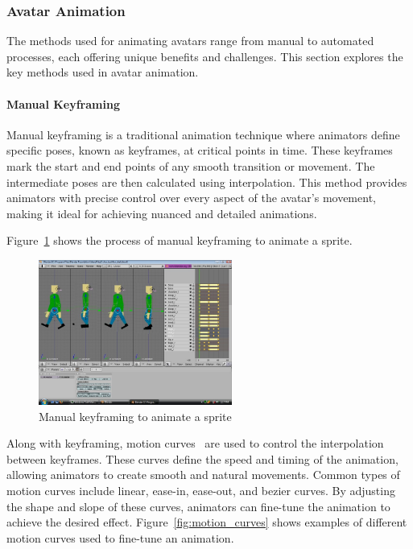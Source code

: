 \documentclass[../../main.tex]{subfiles}
\begin{document}
\subsubsection{Avatar Animation}
\label{ch:background_work:sign_language_synthesis:3d_techniques:avatar_animation}

The methods used for animating avatars range from manual to automated processes, each offering unique benefits and challenges. This section explores the key methods used in avatar animation.

\paragraph{Manual Keyframing}
\label{ch:background_work:sign_language_synthesis:3d_techniques:avatar_animation:manual_keyframing}

Manual keyframing is a traditional animation technique where animators define specific poses, known as keyframes, at critical points in time. These keyframes mark the start and end points of any smooth transition or movement. The intermediate poses are then calculated using interpolation. This method provides animators with precise control over every aspect of the avatar’s movement, making it ideal for achieving nuanced and detailed animations.

Figure~\ref{fig:keyframing} shows the process of manual keyframing to animate a sprite.

\begin{figure} 
  \centering \includegraphics[width = 2.5in]{chapters/background_work/images/keyframing.png} 
  \caption{Manual keyframing to animate a sprite} 
  \label{fig:keyframing} 
\end{figure}

Along with keyframing, motion curves~\cite{10.1145/218380.218422} are used to control the interpolation between keyframes. These curves define the speed and timing of the animation, allowing animators to create smooth and natural movements. Common types of motion curves include linear, ease-in, ease-out, and bezier curves. By adjusting the shape and slope of these curves, animators can fine-tune the animation to achieve the desired effect. Figure~\ref{fig:motion_curves} shows examples of different motion curves used to fine-tune an animation.
\end{document}
